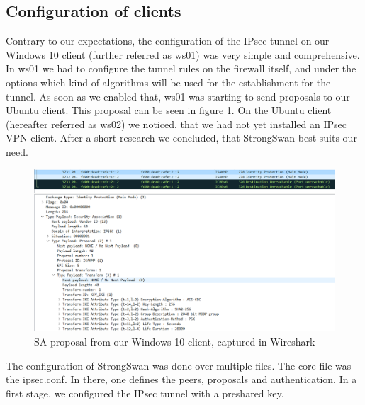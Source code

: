 \documentclass[a4paper]{report}
\begin{document}
\subsection{Configuration of clients}

Contrary to our expectations, the configuration of the IPsec tunnel on our Windows 10 client (further referred as ws01) was very simple and comprehensive. In ws01 we had to configure the tunnel rules on the firewall itself, and under the options which kind of algorithms will be used for the establishment for the tunnel. As soon as we enabled that, ws01 was starting to send proposals to our Ubuntu client. This proposal can be seen in figure \ref{fig:FirstSAProposal}.
On the Ubuntu client (hereafter referred as ws02) we noticed, that we had not yet installed an IPsec VPN client. After a short research we concluded, that StrongSwan best suits our need.

\begin{figure}[htb]
	\includegraphics[width=\linewidth]{IPsec_Proposal_Win10_client.png}
	\caption{SA proposal from our Windows 10 client, captured in Wireshark}
	\label{fig:FirstSAProposal}
\end{figure}

The configuration of StrongSwan was done over multiple files. The core file was the ipsec.conf. In there, one defines the peers, proposals and authentication.
In a first stage, we configured the IPsec tunnel with a preshared key.
\end{document}
